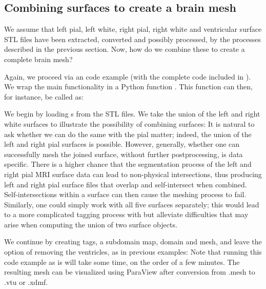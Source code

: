 \subsection{Combining surfaces to create a brain mesh}
We assume that left pial, left white, right pial, right white and
ventricular surface STL files have been extracted, converted and
possibly processed, by the processes described in the previous
section. Now, how do we combine these to create a complete brain mesh?

Again, we proceed via an \svmtk{} code example (with the complete
code included in ). We wrap
the main functionality in a Python function
. This function can then, for
instance, be called as:

We begin by loading s from the STL files. 
We take the union of the left and right white surfaces to illustrate
the possibility of combining surfaces:
It is natural to ask whether we can do the same with the pial matter;
indeed, the union of the left and right pial surfaces is
possible. However, generally, whether one can successfully mesh the
joined surface, without further postprocessing, is data specific.
There is a higher chance that the {\freesurfer} segmentation process
of the left and right pial MRI surface data can lead to non-physical
intersections, thus producing left and right pial surface files that
overlap and self-intersect when combined.  Self-intersections within
a surface can then cause the meshing process to fail. Similarly, one
could simply work with all five surfaces separately; this would lead
to a more complicated tagging process with  but
alleviate difficulties that may arise when computing the union of two
surface objects.

We continue by creating tags, a subdomain map, domain and mesh, and
leave the option of removing the ventricles, as in previous examples:
 Note that
running this code example as is will take some time, on the order of a
few minutes. The resulting mesh can be visualized using ParaView
after conversion from .mesh to .vtu or .xdmf.

